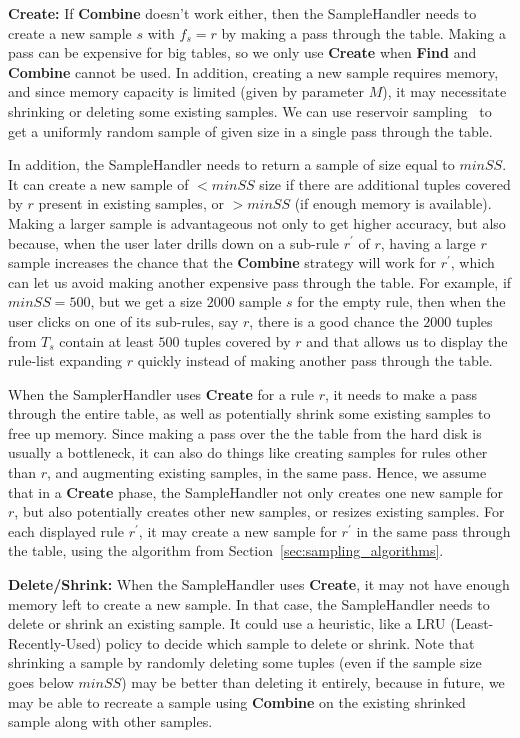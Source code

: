 \item \textbf{Create:} If \textbf{Combine} doesn't work either, then the SampleHandler needs to create a new sample $s$ with $f_s = r$ by making a pass through the table. Making a pass can be expensive for big tables, so we only use \textbf{Create} when \textbf{Find} and \textbf{Combine} cannot be used. In addition, creating a new sample requires memory, and since memory capacity is limited (given by parameter $M$), it may necessitate shrinking or deleting some existing samples. 
We can use reservoir sampling~\cite{maibdr1983,Vitter:1985:RSR:3147.3165} to get a uniformly random sample of given size in a single pass through the table. 

In addition, the SampleHandler needs to return a sample of size equal to $minSS$. It can create a new sample of $< minSS$ size if there are additional tuples covered by $r$ present in existing samples, or $> minSS$ (if enough memory is available). Making a larger sample is advantageous not only to get higher accuracy, but also because, when the user later drills down on a sub-rule $r^{\prime}$ of $r$, having a large $r$ sample increases the chance that the \textbf{Combine} strategy will work for $r^{\prime}$, which can let us avoid making another expensive pass through the table. For example, if $minSS = 500$, but we get a size $2000$ sample $s$ for the empty rule, then when the user clicks on one of its sub-rules, say $r$, there is a good chance the $2000$ tuples from $T_s$ contain at least $500$ tuples covered by $r$ and that allows us to display the rule-list expanding $r$ quickly instead of making another pass through the table. 

When the SamplerHandler uses \textbf{Create} for a rule $r$, it needs to make a pass through the entire table, as well as potentially shrink some existing samples to free up memory. Since making a pass over the the table from the hard disk is usually a bottleneck, it can also do things like creating samples for rules other than $r$, and augmenting existing samples, in the same pass. Hence, we assume that in a \textbf{Create} phase, the SampleHandler not only creates one new sample for $r$, but also potentially creates other new samples, or resizes existing samples. For each displayed rule $r^{\prime}$, it may create a new sample for $r^{\prime}$ in the same pass through the table, using 
the algorithm from Section~\ref{sec:sampling_algorithms}. 

\item \textbf{Delete/Shrink:} When the SampleHandler uses \textbf{Create}, it may not have enough memory left to create a new sample. In that case, the SampleHandler needs to delete or shrink an existing sample. It could use a heuristic, like a LRU (Least-Recently-Used) policy to decide which sample to delete or shrink. Note that shrinking a sample by randomly deleting some tuples (even if the sample size goes below $minSS$) may be better than deleting it entirely, because in future, we may be able to recreate a sample using \textbf{Combine} on the existing shrinked sample along with other samples.
\squishend

